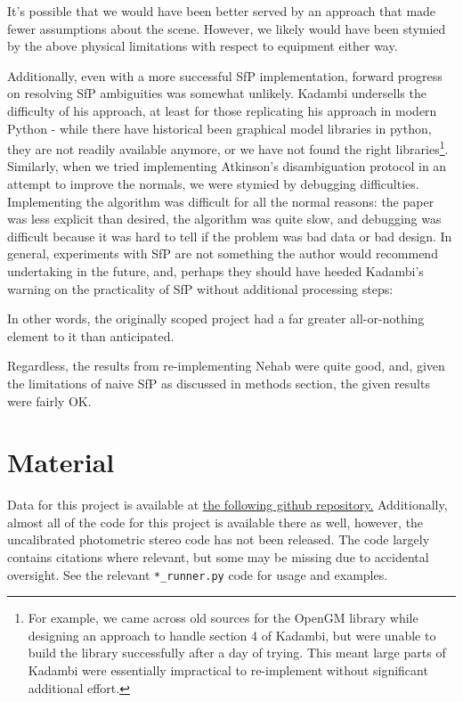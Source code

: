 \documentclass[final]{cvpr}
\begin{document}
It's possible that we would have been better served by an approach that made fewer assumptions about the scene. However, we likely would have been stymied by the above physical limitations with respect to equipment either way. 

Additionally, even with a more successful SfP implementation, forward progress on resolving SfP ambiguities was somewhat unlikely. Kadambi undersells the difficulty of his approach, at least for those replicating his approach in modern Python - while there have historical been graphical model libraries in python, they are not readily available anymore, or we have not found the right libraries\footnote{For example, we came across old sources for the OpenGM library while designing an approach to handle section 4 of Kadambi, but were unable to build the library successfully after a day of trying. This meant large parts of Kadambi were essentially impractical to re-implement without significant additional effort.}. Similarly, when we tried implementing Atkinson's \cite{atkinson} disambiguation protocol in an attempt to improve the normals, we were stymied by debugging difficulties. Implementing the algorithm was difficult for all the normal reasons: the paper was less explicit than desired, the algorithm was quite slow, and debugging was difficult because it was hard to tell if the problem was bad data or bad design. In general,  experiments with SfP are not something the author would recommend undertaking in the future, and, perhaps they should have heeded Kadambi's warning on the practicality of SfP without additional processing steps:  

In other words, the originally scoped project had a far greater all-or-nothing element to it than anticipated. 

Regardless, the results from re-implementing Nehab were quite good, and, given the limitations of naive SfP as discussed in methods section, the given results were fairly OK.  
\section{Material}
Data for this project is available at \href{https://github.com/rob-marcus/463-final-project}{the following github repository.} Additionally, almost all of the code for this project is available there as well, however, the uncalibrated photometric stereo code has not been released. The code largely contains citations where relevant, but some may be missing due to accidental oversight. See the relevant \verb|*_runner.py| code for usage and examples. 
\end{document}

